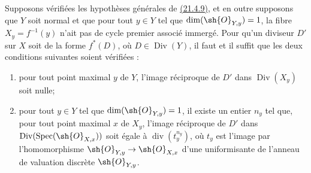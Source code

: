 \begin{corollary}[21.4.10]
\label{IV.21.4.10}
Supposons vérifiées les hypothèses générales de
{\hyperlink{ega4.c04.prop.21-4-9}{(21.4.9)}}, et en outre supposons que
$Y$ soit normal et que pour tout $y\in Y$ tel que
$\dim(\sh{O}_{Y,y})=1$, la fibre $X_y=f^{-1}(y)$ n'ait pas de cycle
premier associé immergé. Pour qu'un diviseur $D'$ sur $X$ soit de la
forme $f^*(D)$, où $D\in\operatorname{Div}(Y)$, il faut et il suffit
que les deux conditions suivantes soient vérifiées :
\begin{enumerate}[label=\textup{\arabic*\textdegree}]
\item pour tout point maximal $y$ de $Y$, l'image réciproque de $D'$
dans $\operatorname{Div}(X_y)$ soit nulle;
\item pour tout $y\in Y$ tel que $\dim(\sh{O}_{Y,y})=1$, il existe un
entier $n_y$ tel que, pour tout point maximal $x$ de $X_y$, l'image
réciproque de $D'$ dans
$\operatorname{Div}(\operatorname{Spec}(\sh{O}_{X,x}))$ soit égale à
$\operatorname{div}(t_y^{n_y})$, où $t_y$ est l'image par
l'homomorphisme $\sh{O}_{Y,y}\to\sh{O}_{X,x}$ d'une uniformisante de
l'anneau de valuation discrète $\sh{O}_{Y,y}$.
\end{enumerate}
\end{corollary}

